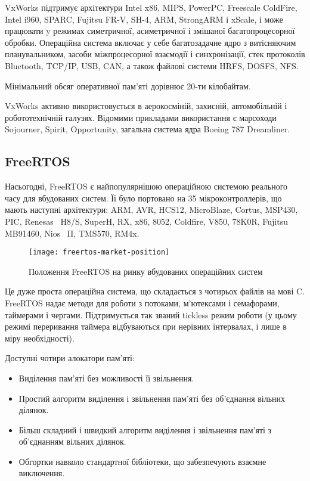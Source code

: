 \documentclass[main.tex]{subfiles}
\begin{document}
VxWorks підтримує архітектури Intel x86, MIPS, PowerPC, Freescale ColdFire, Intel i960, SPARC, Fujitsu FR-V, SH-4, ARM, StrongARM і xScale, і може працювати y режимах симетричної, асиметричної і змішаної багатопроцесорної обробки. Операційна система включає у себе багатозадачне ядро з витісняючим планувальником, засоби міжпроцесорної взаємодії і синхронізації, стек протоколів Bluetooth, \acs{TCP/IP}, \acs{USB}, \acs{CAN}, а також файлові системи \ac{HRFS}, \acs{DOSFS}, \ac{NFS}.

Мінімальний обсяг оперативної пам'яті дорівнює 20-ти кілобайтам.

VxWorks активно використовується в аерокосміній, захисній, автомобільній і робототехнічній галузях. Відомими прикладами використання є марсоходи Sojourner, Spirit, Opportunity\cite{vxworks:rovers}, загальна система ядра Boeing 787 Dreamliner\cite{vxworks:boeing}.

\subsection{FreeRTOS}

Насьогодні, FreeRTOS\cite{freertos} є найпопулярнішою операційною системою реального часу для вбудованих систем\cite{freertos:popular}. Її було портовано на 35 мікроконтроллерів, що мають наступні архітектури: ARM, AVR, HCS12, MicroBlaze, Cortus, MSP430, PIC, Renesas~ H8/S, SuperH, RX, x86, 8052, Coldfire, V850, 78K0R, Fujitsu MB91460, Nios~ II, TMS570, RM4x.

\begin{figure}[h]
  \texttt{[image: freertos-market-position]}
  \caption{Положення FreeRTOS на ринку вбудованих операційних систем}
\end{figure}

Це дуже проста операційна система, що складається з чотирьох файлів на мові C. FreeRTOS надає методи для роботи з потоками, м'ютексами і семафорами, таймерами і чергами. Підтримується так званий tickless режим роботи (у цьому режимі переривання таймера відбуваються при нерівних інтервалах, і лише в міру необхідності).

Доступні чотири алокатори пам'яті:
\begin{itemize}
  \item Виділення пам'яті без можливості її звільнення.
  \item Простий алгоритм виділення і звільнення пам'яті без об'єднання вільних ділянок.
  \item Більш складний і швидкий алгоритм виділення і звільнення пам'яті з об'єднанням вільних ділянок.
  \item Обгортки навколо стандартної бібліотеки, що забезпечують взаємне виключення.
\end{itemize}
\end{document}
